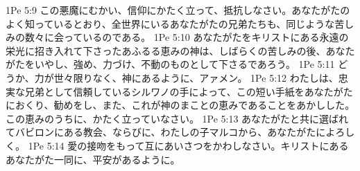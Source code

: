 1Pe 5:9  この悪魔にむかい、信仰にかたく立って、抵抗しなさい。あなたがたのよく知っているとおり、全世界にいるあなたがたの兄弟たちも、同じような苦しみの数々に会っているのである。
1Pe 5:10  あなたがたをキリストにある永遠の栄光に招き入れて下さったあふるる恵みの神は、しばらくの苦しみの後、あなたがたをいやし、強め、力づけ、不動のものとして下さるであろう。
1Pe 5:11  どうか、力が世々限りなく、神にあるように、アァメン。
1Pe 5:12  わたしは、忠実な兄弟として信頼しているシルワノの手によって、この短い手紙をあなたがたにおくり、勧めをし、また、これが神のまことの恵みであることをあかしした。この恵みのうちに、かたく立っていなさい。
1Pe 5:13  あなたがたと共に選ばれてバビロンにある教会、ならびに、わたしの子マルコから、あなたがたによろしく。
1Pe 5:14  愛の接吻をもって互にあいさつをかわしなさい。キリストにあるあなたがた一同に、平安があるように。


